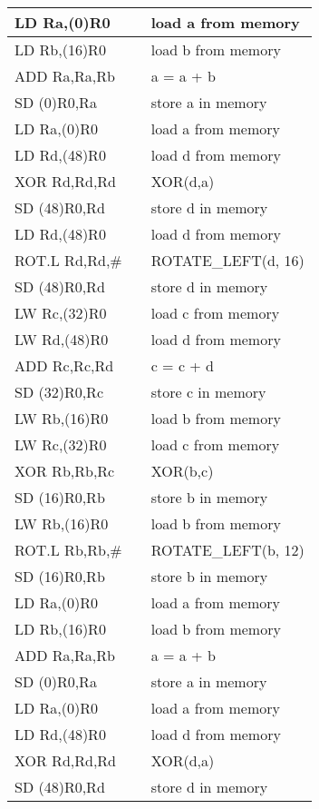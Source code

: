 \begin{enumerate}[wide, label=(B\arabic*)]
\begin{longtable}{|l|l|l|}
LD Ra,(0)R0	&	& load a from memory  \\ \hline
LD Rb,(16)R0	&	& load b from memory  \\ \hline
ADD Ra,Ra,Rb	&	& a = a + b           \\ \hline
SD (0)R0,Ra	&	& store a in memory   \\ \hline
LD Ra,(0)R0	&	& load a from memory  \\ \hline
LD Rd,(48)R0	&	& load d from memory  \\ \hline
XOR Rd,Rd,Rd	&	& XOR(d,a)            \\ \hline
SD (48)R0,Rd	&	& store d in memory   \\ \hline
LD Rd,(48)R0	&	& load d from memory  \\ \hline
ROT.L Rd,Rd,\#	&	& ROTATE\_LEFT(d, 16) \\ \hline
SD (48)R0,Rd	&	& store d in memory   \\ \hline
LW Rc,(32)R0	&	& load c from memory  \\ \hline
LW Rd,(48)R0	&	& load d from memory  \\ \hline
ADD Rc,Rc,Rd	&	& c = c + d           \\ \hline
SD (32)R0,Rc	&	& store c in memory   \\ \hline
LW Rb,(16)R0	&	& load b from memory  \\ \hline
LW Rc,(32)R0	&	& load c from memory  \\ \hline
XOR Rb,Rb,Rc	&	& XOR(b,c)            \\ \hline
SD (16)R0,Rb	&	& store b in memory   \\ \hline
LW Rb,(16)R0	&	& load b from memory  \\ \hline
ROT.L Rb,Rb,\#	&	& ROTATE\_LEFT(b, 12) \\ \hline
SD (16)R0,Rb	&	& store b in memory   \\ \hline
LD Ra,(0)R0	&	& load a from memory  \\ \hline
LD Rb,(16)R0	&	& load b from memory  \\ \hline
ADD Ra,Ra,Rb	&	& a = a + b           \\ \hline
SD (0)R0,Ra	&	& store a in memory   \\ \hline
LD Ra,(0)R0	&	& load a from memory  \\ \hline
LD Rd,(48)R0	&	& load d from memory  \\ \hline
XOR Rd,Rd,Rd	&	& XOR(d,a)            \\ \hline
SD (48)R0,Rd	&	& store d in memory   \\ \hline

\end{longtable}
\end{enumerate}
